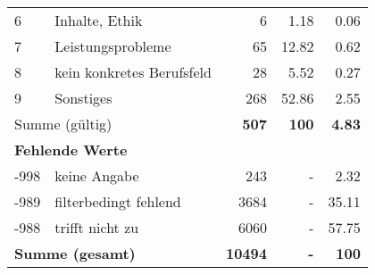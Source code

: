 \begin{longtable}{lXrrr}
     6 &
     \multicolumn{1}{X}{ Inhalte, Ethik   } &


       \num{6} &
       \num[round-mode=places,round-precision=2]{1.18} &
         \num[round-mode=places,round-precision=2]{0.06} \\

     7 &
     \multicolumn{1}{X}{ Leistungsprobleme   } &


       \num{65} &
       \num[round-mode=places,round-precision=2]{12.82} &
         \num[round-mode=places,round-precision=2]{0.62} \\

     8 &
     \multicolumn{1}{X}{ kein konkretes Berufsfeld   } &


       \num{28} &
       \num[round-mode=places,round-precision=2]{5.52} &
         \num[round-mode=places,round-precision=2]{0.27} \\

     9 &
     \multicolumn{1}{X}{ Sonstiges   } &


       \num{268} &
       \num[round-mode=places,round-precision=2]{52.86} &
         \num[round-mode=places,round-precision=2]{2.55} \\
     \midrule
     \multicolumn{2}{l}{Summe (gültig)} &
       \textbf{\num{507}} &
     \textbf{\num{100}} &
       \textbf{\num[round-mode=places,round-precision=2]{4.83}} \\
     \multicolumn{5}{l}{\textbf{Fehlende Werte}}\\
       -998 &
       keine Angabe &
         \num{243} &
        - &
         \num[round-mode=places,round-precision=2]{2.32} \\
       -989 &
       filterbedingt fehlend &
         \num{3684} &
        - &
         \num[round-mode=places,round-precision=2]{35.11} \\
       -988 &
       trifft nicht zu &
         \num{6060} &
        - &
         \num[round-mode=places,round-precision=2]{57.75} \\
     \midrule
     \multicolumn{2}{l}{\textbf{Summe (gesamt)}} &
          \textbf{\num{10494}} &
        \textbf{-} &
        \textbf{\num{100}} \\
     \bottomrule
     \end{longtable}
     
